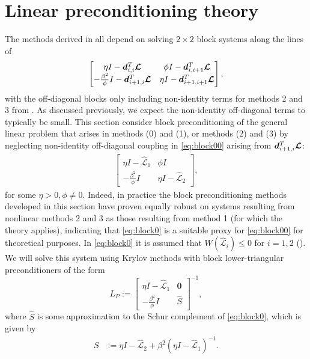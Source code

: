 \documentclass[review]{siamart}
\begin{document}
\section{Linear preconditioning theory}\label{sec:theory}

The methods derived in  all depend on
solving $2\times 2$ block systems along the lines of
%
\begin{align}\label{eq:block00}
\begin{bmatrix} \eta I - \bm{d}_{i,i}^T \bm{{\cal L}} & \phi I - \bm{d}_{i,i+1}^T \bm{{\cal L}}\\
-\frac{\beta^2}{\phi} I - \bm{d}_{i+1,i}^T \bm{{\cal L}} & \eta I -  \bm{d}_{i+1,i+1}^T \bm{{\cal L}}\end{bmatrix},
\end{align}
%
with the off-diagonal blocks only including non-identity terms for 
methods 2 and 3 from . As discussed previously,
we expect the non-identity off-diagonal terms to typically be small. This
section consider block preconditioning of the general linear problem
that arises in methods (0) and (1), or methods (2) and (3) by neglecting
non-identity off-diagonal coupling in \eqref{eq:block00} arising from
$\bm{d}_{i+1,i}^T \bm{{\cal L}}$:
%
\begin{align}\label{eq:block0}
\begin{bmatrix} \eta I - \widehat{\mathcal{L}}_1 & \phi I\\
-\frac{\beta^2}{\phi} I & \eta I - \widehat{\mathcal{L}}_2\end{bmatrix},
\end{align}
%
for some $\eta > 0, \phi \neq 0$. Indeed, in 
practice the block preconditioning methods developed in this section have
proven equally robust on systems resulting from nonlinear methods 2 and 3
as those resulting from method 1 (for which the theory applies), indicating
that \eqref{eq:block0} is a suitable proxy for \eqref{eq:block00} for
theoretical purposes.
In \eqref{eq:block0} it is assumed that
$W(\widehat{\mathcal{L}}_i) \leq 0$ for $i=1,2$ (). We will solve
this system using Krylov methods with block lower-triangular preconditioners
of the form
%
\begin{equation}\label{eq:Lprec}
L_P := \begin{bmatrix} \eta I - \widehat{\mathcal{L}}_1 & \mathbf{0} \\ -\frac{\beta^2}{\phi} I
	& \widehat{S}\end{bmatrix}^{-1},
\end{equation}
%
where $\widehat{S}$ is some approximation to the Schur complement of \eqref{eq:block0},
which is given by
%
\begin{align}\label{eq:Schur}
S & := \eta I - \widehat{\mathcal{L}}_2 + \beta^2 (\eta I - \widehat{\mathcal{L}}_1)^{-1}.
\end{align}
%
\end{document}

